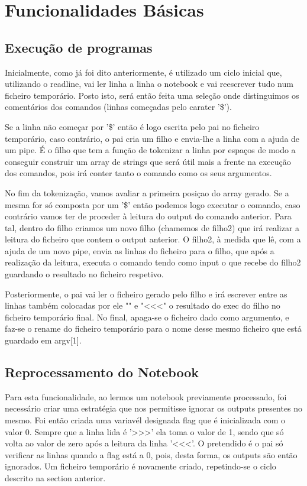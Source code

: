 \documentclass{report}
\begin{document}
\newpage
\section{Funcionalidades Básicas}
\subsection{Execução de programas}
Inicialmente, como já foi dito anteriormente, é utilizado um ciclo inicial que, utilizando o readline, vai ler linha a linha o notebook e vai reescrever tudo num ficheiro temporário. Posto isto, será então feita uma seleção onde distinguimos os comentários dos comandos (linhas começadas pelo carater '\$'). 

Se a linha não começar por '\$' então é logo escrita pelo pai no ficheiro temporário, caso contrário, o pai cria um filho e envia-lhe a linha com a ajuda de um pipe. É o filho que tem a função de tokenizar a linha por espaços de modo a conseguir construir um array de strings que será útil mais a frente na execução dos comandos, pois irá conter tanto o comando como os seus argumentos. 

No fim da tokenização, vamos avaliar a primeira posiçao do array gerado. Se a mesma for só composta por um '\$' então podemos logo executar o comando, caso contrário vamos ter de proceder à leitura do output do comando anterior. Para tal, dentro do filho criamos um novo filho (chamemos de filho2) que irá realizar a leitura do ficheiro que contem o output anterior. O filho2, à medida que lê, com a ajuda de um novo pipe, envia as linhas do ficheiro para o filho, que após a realização da leitura, executa o comando tendo como input o que recebe do filho2 guardando o resultado no ficheiro respetivo. 

Posteriormente, o pai vai ler o ficheiro gerado pelo filho e irá escrever entre as linhas também colocadas por ele "" e "<<<" o resultado do exec do filho no ficheiro temporário final. No final, apaga-se o ficheiro dado como argumento, e faz-se o rename do ficheiro temporário para o nome desse mesmo ficheiro que está guardado em argv[1].

\subsection{Reprocessamento do Notebook}
Para esta funcionalidade, ao lermos um notebook previamente processado, foi necessário criar uma estratégia que nos permitisse ignorar os outputs presentes no mesmo. Foi então criada uma variavél designada flag que é inicializada com o valor 0. Sempre que a linha lida é '>>>' ela toma o valor de 1, sendo que só volta ao valor de zero após a leitura da linha '<<<'. O pretendido é o pai só verificar as linhas quando a flag está a 0, pois, desta forma, os outputs são então ignorados. Um ficheiro temporário é novamente criado, repetindo-se o ciclo descrito na section anterior.
\end{document}
